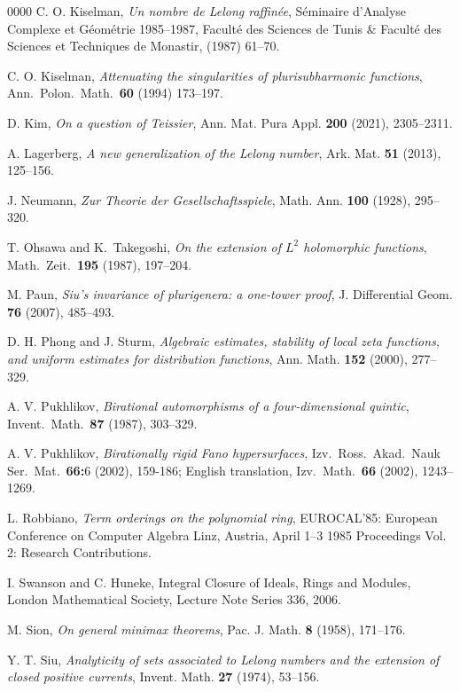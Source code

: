 \documentclass[a4paper,oneside,reqno,11pt]{article}
\begin{document}
\begin{thebibliography}{0000}
 C. O. Kiselman, {\it Un nombre de Lelong raffin\'ee}, S\'eminaire d'Analyse Complexe et G\'eom\'etrie 1985--1987, Facult\'e des Sciences de Tunis \& Facult\'e des Sciences et Techniques de Monastir, (1987) 61--70.

 C. O. Kiselman, {\it Attenuating the singularities of plurisubharmonic functions}, Ann.\ Polon.\ Math.\ {\bf 60} (1994) 173--197.

 D. Kim, {\it On a question of Teissier}, Ann. Mat. Pura Appl. {\bf 200} (2021), 2305--2311.

 A. Lagerberg, {\it A new generalization of the Lelong number}, Ark. Mat. {\bf 51} (2013), 125--156. 

 J. Neumann, {\it Zur Theorie der Gesellschaftsspiele}, Math. Ann. {\bf 100} (1928), 295--320. 

 T. Ohsawa and K.\ Takegoshi, {\it On the extension of $L^2$ holomorphic functions}, Math.\ Zeit.\ {\bf 195} (1987), 197--204.

 M. Paun, {\it Siu's invariance of plurigenera: a one-tower proof}, J. Differential Geom. {\bf 76} (2007), 485--493.

 D. H. Phong and J. Sturm, {\it Algebraic estimates, stability of local zeta functions, and uniform estimates for distribution functions}, Ann. Math. {\bf 152} (2000), 277--329.

 A. V. Pukhlikov, {\it Birational automorphisms of a four-dimensional quintic}, Invent.\ Math.\ {\bf 87} (1987), 303--329.

 A. V. Pukhlikov, {\it Birationally rigid Fano hypersurfaces}, Izv.\ Ross.\ Akad.\ Nauk Ser.\ Mat.\ {\bf 66:}6 (2002), 159-186; English translation, Izv.\ Math.\ {\bf 66} (2002), 1243--1269.

 L. Robbiano, {\it Term orderings on the polynomial ring}, EUROCAL'85: European Conference on Computer Algebra Linz, Austria, April 1--3 1985 Proceedings Vol. 2: Research Contributions.

  I. Swanson and C. Huneke, Integral Closure of Ideals, Rings and Modules, London Mathematical Society, Lecture Note Series 336, 2006.

 M. Sion, {\it On general minimax theorems},  Pac. J. Math. {\bf 8} (1958), 171--176. 

 Y. T. Siu, {\it Analyticity of sets associated to Lelong numbers and the extension of closed positive currents}, Invent. Math. {\bf 27} (1974), 53--156.


\end{thebibliography}
\end{document}
